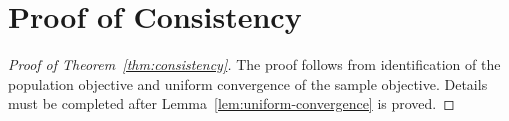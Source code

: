\section{Proof of Consistency}\label{app:consistency-proof}

\begin{proof}[Proof of Theorem~\ref{thm:consistency}]
The proof follows from identification of the population objective and uniform convergence of the sample objective. Details must be completed after Lemma~\ref{lem:uniform-convergence} is proved.
\end{proof}


